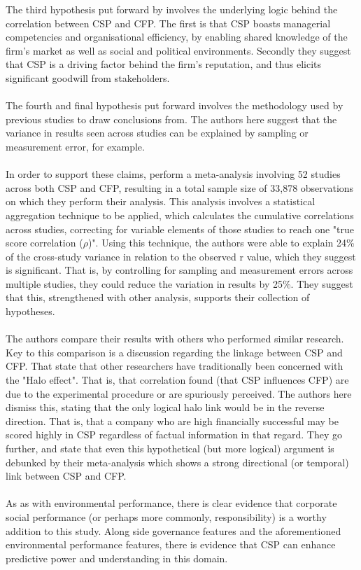 {The third hypothesis put forward by \cite{orlitzky2003corporate} involves the underlying logic behind the correlation between CSP and CFP. The first is that CSP boasts managerial competencies and organisational efficiency, by enabling shared knowledge of the firm's market as well as social and political environments. Secondly they suggest that CSP is a driving factor behind the firm's reputation, and thus elicits significant goodwill from stakeholders. \\\\
The fourth and final hypothesis put forward involves the methodology used by previous studies to draw conclusions from. The authors here suggest that the variance in results seen across studies can be explained by sampling or measurement error, for example. \\\\
In order to support these claims, \cite{orlitzky2003corporate} perform a meta-analysis involving 52 studies across both CSP and CFP, resulting in a total sample size of 33,878 observations on which they perform their analysis. This analysis involves a statistical aggregation technique to be applied, which calculates the cumulative correlations across studies, correcting for variable elements of those studies to reach one "true score correlation ($\rho$)". Using this technique, the authors were able to explain 24\% of the cross-study variance in relation to the observed r value, which they suggest is significant. That is, by controlling for sampling and measurement errors across multiple studies, they could reduce the variation in results by 25\%. They suggest that this, strengthened with other analysis, supports their collection of hypotheses.\\\\
The authors compare their results with others who performed similar research. Key to this comparison is a discussion regarding the linkage between CSP and CFP. That state that other researchers have traditionally been concerned with the "Halo effect". That is, that correlation found (that CSP influences CFP) are due to the experimental procedure or are spuriously perceived. The authors here dismiss this, stating that the only logical halo link would be in the reverse direction. That is, that a company who are high financially successful may be scored highly in CSP regardless of factual information in that regard. They go further, and state that even this hypothetical (but more logical) argument is debunked by their meta-analysis which shows a strong directional (or temporal) link between CSP and CFP. \\\\
As as with environmental performance, there is clear evidence that corporate social performance (or perhaps more commonly, responsibility) is a worthy addition to this study. Along side governance features and the aforementioned environmental performance features, there is evidence that CSP can enhance predictive power and understanding in this domain.    }
